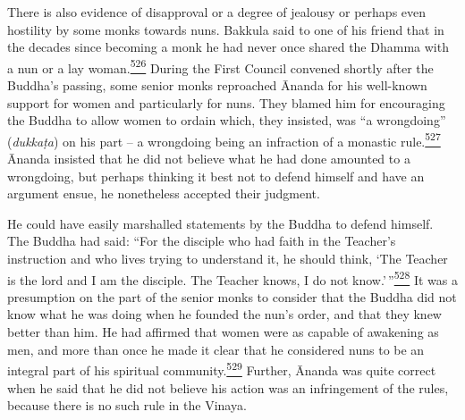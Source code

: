 There is also evidence of disapproval or a degree of jealousy or perhaps
even hostility by some monks towards nuns. Bakkula said to one of his
friend that in the decades since becoming a monk he had never once
shared the Dhamma with a nun or a lay
woman.\label{footprints_split_014.html_fnref526}\hyperref[footprints_split_025.htmlux5cux23fn526]{\textsuperscript{526}}
During the First Council convened shortly after the Buddha's passing,
some senior monks reproached Ānanda for his well-known support for women
and particularly for nuns. They blamed him for encouraging the Buddha to
allow women to ordain which, they insisted, was ``a wrongdoing''
(\emph{dukkaṭa}) on his part -- a wrongdoing being an infraction of a
monastic
rule.\label{footprints_split_014.html_fnref527}\hyperref[footprints_split_025.htmlux5cux23fn527]{\textsuperscript{527}}
Ānanda insisted that he did not believe what he had done amounted to a
wrongdoing, but perhaps thinking it best not to defend himself and have
an argument ensue, he nonetheless accepted their judgment.

He could have easily marshalled statements by the Buddha to defend
himself. The Buddha had said: ``For the disciple who had faith in the
Teacher's instruction and who lives trying to understand it, he should
think, `The Teacher is the lord and I am the disciple. The Teacher
knows, I do not
know.'\,''\label{footprints_split_014.html_fnref528}\hyperref[footprints_split_025.htmlux5cux23fn528]{\textsuperscript{528}}
It was a presumption on the part of the senior monks to consider that
the Buddha did not know what he was doing when he founded the nun's
order, and that they knew better than him. He had affirmed that women
were as capable of awakening as men, and more than once he made it clear
that he considered nuns to be an integral part of his spiritual
community.\label{footprints_split_014.html_fnref529}\hyperref[footprints_split_025.htmlux5cux23fn529]{\textsuperscript{529}}
Further, Ānanda was quite correct when he said that he did not believe
his action was an infringement of the rules, because there is no such
rule in the Vinaya.

